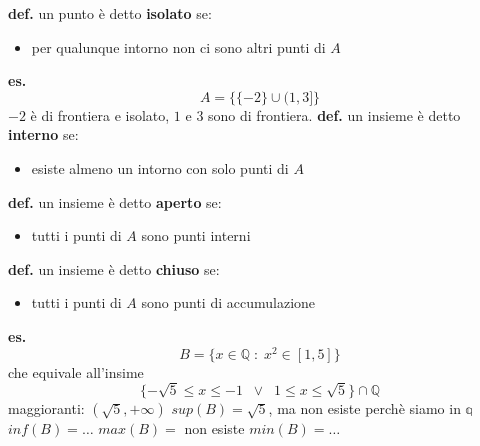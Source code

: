 \textbf{def.} un punto è detto \textbf{isolato} se:
\begin{itemize}
    \item per qualunque intorno non ci sono altri punti di $A$
\end{itemize}
\textbf{es.}
\[
    A = \{\{-2\}\cup(1,3]\}
\]
$-2$ è di frontiera e isolato, $1$ e $3$ sono di frontiera.
\newline
\newline
\textbf{def.} un insieme è detto \textbf{interno} se:
\begin{itemize}
    \item esiste almeno un intorno con solo punti di $A$
\end{itemize}
\textbf{def.} un insieme è detto \textbf{aperto} se:
\begin{itemize}
    \item tutti i punti di $A$ sono punti interni
\end{itemize}
\textbf{def.} un insieme è detto \textbf{chiuso} se:
\begin{itemize}
    \item tutti i punti di $A$ sono punti di accumulazione
\end{itemize}
\textbf{es.}
\[
    B = \{x \in \mathbb{Q} \;:\; x^2 \in [1,5]\}
\]
che equivale all'insime
\[
    \{- \sqrt{5} \leq x \leq -1 \;\; \lor \;\; 1\leq x\leq\sqrt{5} \} \cap \mathbb{Q}
\]
maggioranti: $(\sqrt{5}, +\infty)$
\newline
$sup(B) = \sqrt{5}$, ma non esiste perchè siamo in $\mathbb{q}$
\newline
$inf(B) = \dots$
\newline
$max(B) =$ non esiste
\newline
$min(B) = \dots$